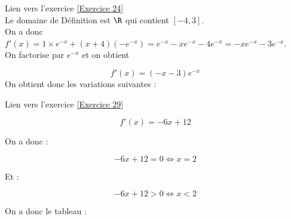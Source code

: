 \documentclass[12pt,fleqn]{report} %
\begin{document}
\begin{correction}Lien vers l'exercice   \ref{Exercice 24}\\
	Le domaine de Définition est $\R$ qui contient $[-4,3]$.\\
	On a donc $f'(x) = 1 \times e^{-x} + (x+4)(-e^{-x}) =  e^{-x}-xe^{-x}-4e^{-x}=-xe^{-x}-3e^{-x}$.\\	
	On factorise par $e^{-x}$ et on obtient 
	
	\[
	f'(x)=(-x-3)e^{-x}
	\]
	On obtient donc les variations suivantes : 
	\begin{center}
	\end{center}
\end{correction}



\begin{correction}Lien vers l'exercice   \ref{Exercice 29}
	
	\begin{equation*}
	f'(x)= -6x + 12
	\end{equation*}
	
	\quad
	
	On a donc :
	
	\begin{equation*}
	-6x + 12 = 0 \iff x = 2
	\end{equation*}
	
	\quad
	Et :
	
	\begin{equation*}
	-6x + 12 > 0 \iff x < 2
	\end{equation*}
	
	On a donc le tableau :
	
	\begin{center}
	\end{center}
\end{correction}
\end{document}
